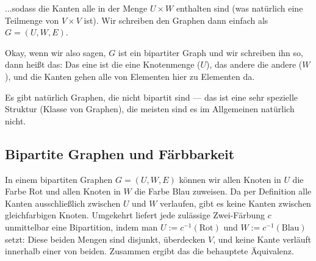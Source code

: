 \begin{spoken-clean}[00:58:30 - 00:59:56]
...sodass die Kanten alle in der Menge $U \times W$ enthalten sind (was natürlich eine Teilmenge von $V \times V$ ist). Wir schreiben den Graphen dann einfach als $G = (U, W, E)$.

Okay, wenn wir also sagen, $G$ ist ein bipartiter Graph und wir schreiben ihn so, dann heißt das: Das eine ist die eine Knotenmenge ($U$), das andere die andere ($W$), und die Kanten gehen alle von Elementen hier zu Elementen da. 

Es gibt natürlich Graphen, die nicht bipartit sind --- das ist eine sehr spezielle Struktur (Klasse von Graphen), die meisten sind es im Allgemeinen natürlich nicht.
\end{spoken-clean}


\subsection{Bipartite Graphen und Färbbarkeit}

\begin{math-stroke}

\begin{explanation-of-steps}
In einem bipartiten Graphen $G = (U, W, E)$ können wir allen Knoten in $U$ die Farbe Rot und allen Knoten in $W$ die Farbe Blau zuweisen. Da per Definition alle Kanten ausschließlich zwischen $U$ und $W$ verlaufen, gibt es keine Kanten zwischen gleichfarbigen Knoten. Umgekehrt liefert jede zulässige Zwei-Färbung $c$ unmittelbar eine Bipartition, indem man $U := c^{-1}(\text{Rot})$ und $W := c^{-1}(\text{Blau})$ setzt: Diese beiden Mengen sind disjunkt, überdecken $V$, und keine Kante verläuft innerhalb einer von beiden. Zusammen ergibt das die behauptete Äquivalenz.
\end{explanation-of-steps}
\end{math-stroke}

